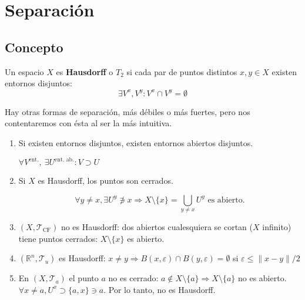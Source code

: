 \chapter{Separación}%
\label{cha:separacion}

\section{Concepto}%
\label{sec:concepto}
\begin{defi}
Un espacio $X$ es \textbf{Hausdorff} o $T_2$ si cada par de puntos distintos $x, y \in X$ existen entornos disjuntos:
\[
\exists V^x, V^y: V^x \cap V^y = \emptyset
\]
\end{defi}
Hay otras formas de separación, más débiles o más fuertes, pero nos contentaremos con ésta al ser la más intuitiva.
\begin{obs}
\begin{enumerate}
    \item Si existen entornos disjuntos, existen entornos abiertos disjuntos.
    \begin{demo}
        $\forall V^{\text{ent.}},\ \exists U^{\text{ent. ab.}}: V \supset U$
    \end{demo}
    \item Si $X$ es Hausdorff, los puntos son cerrados.
    \begin{demo}    
    \[
    \forall y \neq x, \exists U^y \not\ni x \Rightarrow X \setminus \{x\} = \bigcup_{y \neq x} U^y  \text{ es abierto.} 
    \]
    \end{demo}
    \item $\left( X, \mathcal{T}_{\text{CF}} \right)$ no es Hausdorff: dos abiertos cualesquiera se cortan ($X$ infinito) tiene puntos cerrados: $X\setminus \{x\}$ es abierto.

    \item $\left( \mathbb{R}^n, \mathcal{T}_{u} \right)$ es Hausdorff: $x \neq y \Rightarrow B\left( x, \varepsilon \right) \cap B\left( y, \varepsilon \right) = \emptyset$ si $\varepsilon \le \lVert x - y \rVert / 2$

    \item En $\left( X, \mathcal{T}_a \right)$ el punto $a$ no es cerrado: $a \not\in X \setminus \{a\} \Rightarrow X \setminus \{a\}$ no es abierto. $\forall x \neq a, U^x \supset \{a, x\} \ni a$. Por lo tanto, no es Hausdorff. 
\end{enumerate}
\end{obs}

